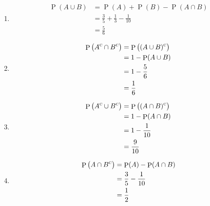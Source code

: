 \documentclass[fleqn, a4paper, 11pt, oneside]{amsart}
\theoremstyle{definition}
\theoremstyle{theorem}
\DeclareMathOperator{\comp}{\textsc{c}}
\DeclareMathOperator{\prob}{\mathrm{P}}
\begin{document}
\begin{solution}
	\begin{enumerate}[leftmargin=*]
		\item
			\begin{align*}
				\prob(A \cup B) & = \prob(A) + \prob(B) - \prob(A \cap B)    \\
                                                & = \frac{3}{5} + \frac{1}{3} - \frac{1}{10} \\
                                                & = \frac{5}{6}
			\end{align*}
		\item
			\begin{align*}
				\prob\left( A^{\comp} \cap B^{\comp} \right) & = \prob\left( (A \cup B)^{\comp} \right) \\
                                                                             & = 1 - \prob(A \cup B)                    \\
                                                                             & = 1 - \frac{5}{6}                        \\
                                                                             & = \frac{1}{6}
			\end{align*}
		\item
			\begin{align*}
				\prob\left( A^{\comp} \cup B^{\comp} \right) & = \prob\left( (A \cap B)^{\comp} \right) \\
                                                                             & = 1 - \prob(A \cap B)                    \\
                                                                             & = 1 - \frac{1}{10}                       \\
                                                                             & = \frac{9}{10}
			\end{align*}
		\item
			\begin{align*}
				\prob\left( A \cap B^{\comp} \right) & = \prob(A) - \prob(A \cap B) \\
                                                                     & = \frac{3}{5} - \frac{1}{10} \\
                                                                     & = \frac{1}{2}
			\end{align*}
	\end{enumerate}
\end{solution}
\end{document}
